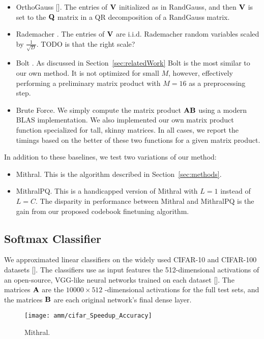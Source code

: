 \begin{itemize}
    \item OrthoGauss []. The entries of $\mathbf{V}$ initialized as in RandGauss, and then $\mathbf{V}$ is set to the $\mathbf{Q}$ matrix in a QR decomposition of a RandGauss matrix.
    \item Rademacher \cite{sparseJL}. The entries of $\mathbf{V}$ are i.i.d. Rademacher random variables scaled by $\frac{1}{\sqrt{D}}$. TODO is that the right scale?
    \item Bolt \cite{bolt}. As discussed in Section~\ref{sec:relatedWork} Bolt is the most similar to our own method. It is not optimized for small $M$, however, effectively performing a preliminary matrix product with $M=16$ as a preprocessing step.
    \item Brute Force. We simply compute the matrix product $\mathbf{A}\mathbf{B}$ using a modern BLAS implementation. We also implemented our own matrix product function specialized for tall, skinny matrices. In all cases, we report the timings based on the better of these two functions for a given matrix product.
\end{itemize}

In addition to these baselines, we test two variations of our method:
\begin{itemize}
    \item Mithral. This is the algorithm described in Section~\ref{sec:methods}.
    \item MithralPQ. This is a handicapped version of Mithral with $L=1$ instead of $L=C$. The disparity in performance between Mithral and MithralPQ is the gain from our proposed codebook finetuning algorithm.
\end{itemize}

\subsection{Softmax Classifier}

We approximated linear classifiers on the widely used CIFAR-10 and CIFAR-100 datasets []. The classifiers use as input features the 512-dimensional activations of an open-source, VGG-like neural networks trained on each dataset []. The matrices $\mathbf{A}$ are the $10000 \times 512$ -dimensional activations for the full test sets, and the matrices $\mathbf{B}$ are each original network's final dense layer.

\begin{figure}[h]
\begin{center}
\texttt{[image: amm/cifar\_Speedup\_Accuracy]}
\caption{Mithral.}
\label{fig:cifar}
\end{center}
\end{figure}

